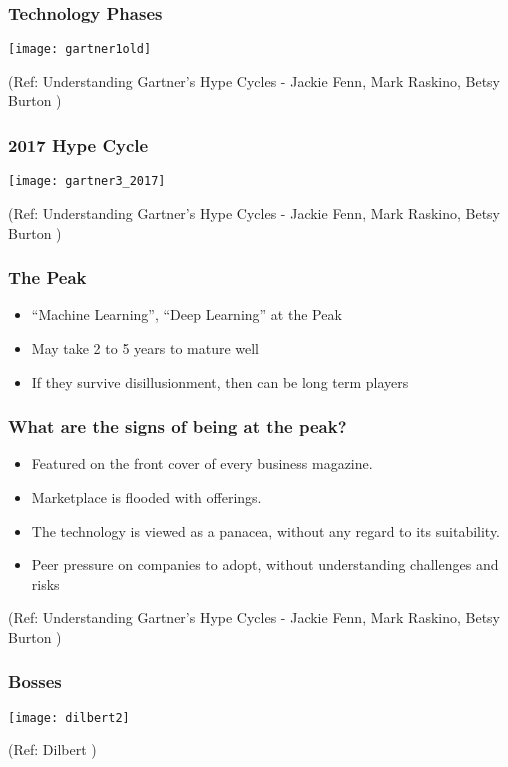 \begin{frame}[fragile]\frametitle{Technology Phases}
\begin{center}
\texttt{[image: gartner1old]}
\end{center}
{\tiny (Ref: Understanding Gartner's Hype Cycles - Jackie Fenn, Mark Raskino, Betsy Burton )}
\end{frame}

\begin{frame}[fragile]\frametitle{2017 Hype Cycle}
\begin{center}
\texttt{[image: gartner3\_2017]}
\end{center}
{\tiny (Ref: Understanding Gartner's Hype Cycles - Jackie Fenn, Mark Raskino, Betsy Burton )}
\end{frame}


\begin{frame}[fragile]\frametitle{The Peak}
\begin{itemize}
\item ``Machine Learning'', ``Deep Learning'' at the Peak
\item May take 2 to 5 years to mature well
\item If they survive disillusionment, then can be long term players
\end{itemize}
\end{frame}


\begin{frame}[fragile]\frametitle{What are the signs of being at the peak?}
\begin{itemize}
\item Featured on the front cover of every business magazine.
\item Marketplace is flooded with offerings.
\item  The technology is viewed as a panacea, without any regard to its
suitability.
\item Peer pressure on companies to adopt, without understanding challenges and risks
\end{itemize}
{\tiny (Ref: Understanding Gartner's Hype Cycles - Jackie Fenn, Mark Raskino, Betsy Burton )}
\end{frame}

\begin{frame}[fragile]\frametitle{Bosses}
\begin{center}
\texttt{[image: dilbert2]}
\end{center}
{\tiny (Ref: Dilbert )}
\end{frame}

